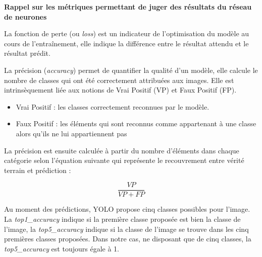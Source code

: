  \begin{minipage}{\dimexpr\textwidth-3cm}
	\textbf{Rappel sur les métriques permettant de juger des résultats du réseau de neurones}

	La fonction de perte (ou \textit{loss}) est un indicateur de l'optimisation du modèle au cours de l'entraînement, elle indique la différence entre le résultat attendu et le résultat prédit.
	
	La précision (\textit{accuracy}) permet de quantifier la qualité d'un modèle, elle calcule le nombre de classes qui ont été correctement attribuées aux images. Elle est intrinsèquement liée aux notions de Vrai Positif (VP) et Faux Positif (FP).
	\begin{itemize}
	    \item Vrai Positif : les classes correctement reconnues par le modèle. 
	    \item Faux Positif : les éléments qui sont reconnus comme appartenant à une classe alors qu'ils ne lui appartiennent pas 
	\end{itemize}

	La précision est ensuite calculée à partir du nombre d'éléments dans chaque catégorie selon l'équation suivante qui représente le recouvrement entre vérité terrain et prédiction : 

	\[ \frac{VP}{VP+FP} \] 
	
\noindent Au moment des prédictions, YOLO propose cinq classes possibles pour l'image. La \textit{top1\_accuracy} indique si la première classe proposée est bien la classe de l'image, la \textit{top5\_accuracy} indique si la classe de l'image se trouve dans les cinq premières classes proposées. Dans notre cas, ne disposant que de cinq classes, la \textit{top5\_accuracy} est toujours égale à 1.\\
 \end{minipage}

